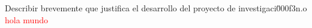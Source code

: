 

Describir brevemente que justifica el desarrollo del proyecto de investigaci\u000f3n.o
\\

\textcolor{red}{hola mundo}
